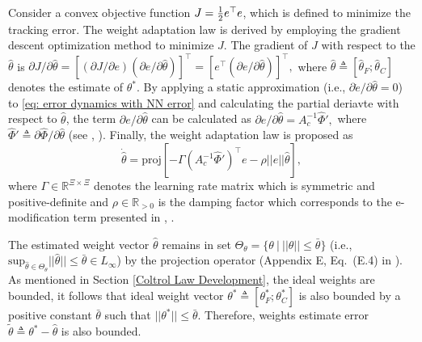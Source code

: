\documentclass{l4dc2025}
\begin{document}
Consider a convex objective function $J={1\over 2}e^\top  e$, which is defined to minimize the tracking error. The weight adaptation law is derived by employing the gradient descent optimization method to minimize $J$. The gradient of $J$ with respect to the $\hat\theta$ is 
$
    {\partial J/\partial \hat\theta} = 
    [
        {(\partial J/\partial e)}
        {(\partial e/\partial \hat\theta)}
    ]^\top   
    =
    [
    e^\top  
    {(\partial e/\partial \hat\theta)}
    ]^\top  
    ,
$
where $\hat\theta\triangleq [\hat\theta_F;\hat\theta_C]$ denotes the estimate of $\theta^*$. 
By applying a static approximation (i.e., $\partial\dot e/\partial \hat\theta = 0$) to \eqref{eq: error dynamics with NN error} and calculating the partial deriavte with respect to $\hat\theta$, the term $\partial e/\partial \hat\theta$ can be calculated as
$
    {\partial e/\partial \hat\theta} 
    = A_c^{-1} \hat\Phi',
$
where $\hat\Phi'\triangleq \partial\hat\Phi/\partial\hat\theta$ 
(see \cite{BookEKcontrol}, \cite{BoockEKestimation}).
Finally, the weight adaptation law is proposed as 
\begin{equation}
        \dot{\hat \theta} =
            \text{proj}
            [
            -\Gamma 
            (A_c^{-1}\hat\Phi')^\top   e 
            -\rho||e|| \hat\theta
            ]
        ,
    \label{eq: adaptation law}
\end{equation}
where $\Gamma\in\mathbb{R}^{\Xi\times \Xi}$ denotes the learning rate matrix which is symmetric and positive-definite and $\rho\in\mathbb{R}_{>0}$ is the damping factor which corresponds to the e-modification term presented in \cite{BookEKcontrol}, \cite{BoockEKestimation}. 

The estimated weight vector $\hat\theta$ remains in set $\Theta_{\theta}=\{\theta \ |\  ||\theta||\le\bar\theta\}$ (i.e., $\text{sup}_{\hat\theta\in\Theta_{\theta}} ||\hat\theta|| \le \bar \theta\in L_\infty$) by the projection operator (Appendix E, Eq.~(E.4) in \cite{BookProjection}).
As mentioned in Section \ref{Coltrol Law Development}, the ideal weights are bounded, it follows that ideal weight vector $\theta^*\triangleq[\theta^*_F;\theta_C^*]$ is also bounded by a positive constant $\bar\theta$ such that $||\theta^*||\le\bar\theta$. 
Therefore, weights estimate error $\tilde\theta\triangleq\theta^*-\hat\theta$ is also bounded.
\end{document}
